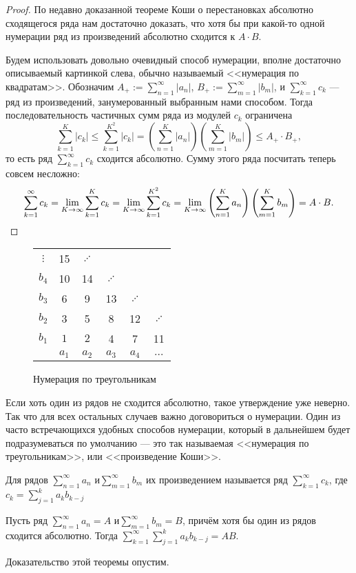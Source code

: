 \documentclass[a4paper, 12pt]{article}
\begin{document}
	\begin{proof} По недавно доказанной теореме Коши о перестановках абсолютно сходящегося ряда нам достаточно доказать, что хотя бы при какой-то одной нумерации ряд из произведений абсолютно сходится к $A\cdot B$.	
		
		Будем использовать довольно очевидный способ нумерации, вполне достаточно описываемый картинкой слева, обычно называемый <<нумерация по квадратам>>. 	Обозначим $A_+ := \sum\limits_{n=1}^{\infty}|a_n|$,  $B_+ := \sum\limits_{m=1}^{\infty}|b_m|$, и $\sum\limits_{k=1}^{\infty}c_k$ --- ряд из произведений, занумерованный выбранным нами способом. Тогда последовательность частичных сумм ряда из модулей $c_k$ ограничена \\
		\[
		\sum\limits_{k=1}^{K}|c_k| \leq \sum\limits_{k=1}^{K^2}|c_k| = \left(\sum\limits_{n=1}^{K}|a_n|\right)\left(\sum\limits_{m=1}^{K}|b_m|\right) \leq A_+\cdot B_+,
		\] 
		то есть ряд $\sum\limits_{k=1}^{\infty}c_k$ сходится абсолютно. 
		Сумму этого ряда посчитать теперь совсем несложно:
		\[\sum\limits_{k=1}^{\infty}c_k = \lim\limits_{K\rightarrow \infty} \sum\limits_{k=1}^{K}c_k = \lim\limits_{K\rightarrow \infty} \sum\limits_{k=1}^{K^2}c_k = \lim\limits_{K\rightarrow \infty} \left(\sum\limits_{n=1}^{K}a_n\right)\left(\sum\limits_{m=1}^{K}b_m\right)=A\cdot B.
		\]
		\end{proof}
	\begin{wrapfigure}{r}{0.3\linewidth}
		\begin{tabular}[t]{c|ccccc}
			$\vdots$ &15& $\iddots$& & & \\
			$b_4$ & 10 & 14&$\iddots$ &&  \\
			$b_3$ & 6 & 9 & 13&$\iddots$ &   \\
			$b_2$ & 3 & 5& 8 & 12&$\iddots$ \\
			$b_1$ & $1$ & $2$ &4&7&11\\
			\hline
			& $a_1$ & $a_2$ & $a_3$ & $a_4$ &$\dots$ \\
		\end{tabular}
		\caption{Нумерация по треугольникам}
		\vspace{-70pt}
	\end{wrapfigure}
	Если хоть один из рядов не сходится абсолютно, такое утверждение уже неверно. Так что для всех остальных случаев важно договориться о нумерации. Один из часто встречающихся удобных способов нумерации, который в дальнейшем будет подразумеваться по умолчанию --- это так называемая <<нумерация по треугольникам>>, или <<произведение Коши>>.
	\begin{Def}
		Для рядов $\sum\limits_{n=1}^{\infty}a_n$ и$ \sum\limits_{m=1}^{\infty}b_m$ их произведением называется ряд  $\sum\limits_{k=1}^{\infty}c_k$, где $c_k =\sum\limits_{j=1}^{k}a_kb_{k-j}$
	\end{Def}
	
	\begin{Theorem}[Мертенса]
		Пусть ряд $\sum\limits_{n=1}^{\infty}a_n = A $ и$ \sum\limits_{m=1}^{\infty}b_m = B$, причём хотя бы один из рядов сходится абсолютно. Тогда $\sum\limits_{k=1}^{\infty}\sum\limits_{j=1}^{k}a_kb_{k-j} = AB$.
	\end{Theorem}
	
	Доказательство этой теоремы опустим.
\end{document}
